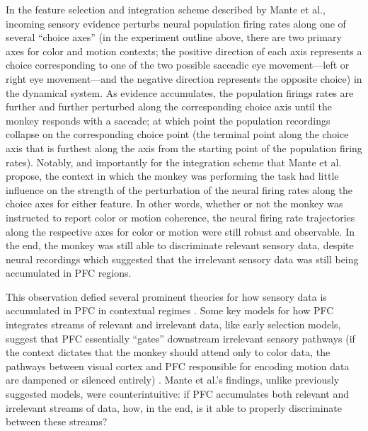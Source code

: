 \documentclass[12pt,a4paper,final]{iopart}
\begin{document}
In the feature selection and integration scheme described by Mante et al., incoming sensory evidence perturbs neural population firing rates along one of several “choice axes” (in the experiment outline above, there are two primary axes for color and motion contexts; the positive direction of each axis represents a choice corresponding to one of the two possible saccadic eye movement—left or right eye movement—and the negative direction represents the opposite choice) in the dynamical system. As evidence accumulates, the population firings rates are further and further perturbed along the corresponding choice axis until the monkey responds with a saccade; at which point the population recordings collapse on the corresponding choice point (the terminal point along the choice axis that is furthest along the axis from the starting point of the population firing rates). Notably, and importantly for the integration scheme that Mante et al. propose, the context in which the monkey was performing the task had little influence on the strength of the perturbation of the neural firing rates along the choice axes for either feature. In other words, whether or not the monkey was instructed to report color or motion coherence, the neural firing rate trajectories along the respective axes for color or motion were still robust and observable. In the end, the monkey was still able to discriminate relevant sensory data, despite neural recordings which suggested that the irrelevant sensory data was still being accumulated in PFC regions.

This observation defied several prominent theories for how sensory data is accumulated in PFC in contextual regimes \cite{Mante2013}. Some key models for how PFC integrates streams of relevant and irrelevant data, like early selection models, suggest that PFC essentially “gates” downstream irrelevant sensory pathways (if the context dictates that the monkey should attend only to color data, the pathways between visual cortex and PFC responsible for encoding motion data are dampened or silenced entirely) \cite{JDCohen:2001}. Mante et al.’s findings, unlike previously suggested models, were counterintuitive: if PFC accumulates both relevant and irrelevant streams of data, how, in the end, is it able to properly discriminate between these streams?
\end{document}
